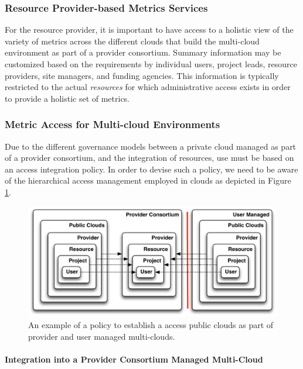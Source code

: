 \documentclass{tex/sig-alternate-2013}
\begin{document}
{\subsubsection{Resource Provider-based Metrics Services} \label{S:resource-metric}

For the resource provider, it is important to have access to a holistic view of the variety of metrics across the different clouds that build the multi-cloud environment as part of a provider consortium.  Summary information may be customized based on the requirements by individual users, project leads, resource providers, site managers, and funding agencies. This information is typically restricted to the actual {\em resources} for which administrative access exists in order to provide a holistic set of metrics.

\subsubsection{Metric Access for Multi-cloud Environments} 

Due to the different governance models between a private cloud managed as part of a provider consortium, and the integration of resources, use must be based on an access integration policy. In order to devise such a policy, we need to be aware of the hierarchical access management employed in clouds as depicted in Figure \ref{F:metric-hierarchy}.

\begin{figure}[htb]
  \centering
    \includegraphics[width=1.0\columnwidth]{images/metric-hierarchy.pdf}
  \caption{An example of a policy to establish a access public clouds as part of 
    provider and user managed multi-clouds.}
  \label{F:metric-hierarchy}
\end{figure}


\paragraph{Integration into a Provider Consortium Managed Multi-Cloud}

}
\end{document}
